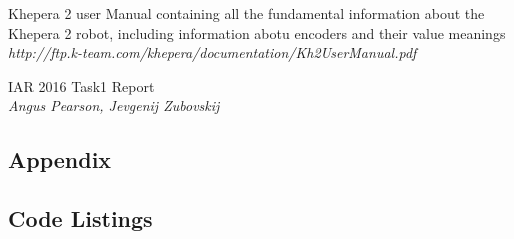 \documentclass[11pt, a4paper]{article}
\begin{document}
\begin{thebibliography}{9}
\par{Khepera 2 user Manual containing all the fundamental information about the Khepera 2 robot, including information abotu encoders and their value meanings} \\
\textit{http://ftp.k-team.com/khepera/documentation/Kh2UserManual.pdf}

\par{IAR 2016 Task1 Report} \\
\textit{Angus Pearson, Jevgenij Zubovskij}

\end{thebibliography}

\newpage
\begin{appendices}
\section*{Appendix}
\subsection{Code Listings}












\end{appendices}
\end{document}
